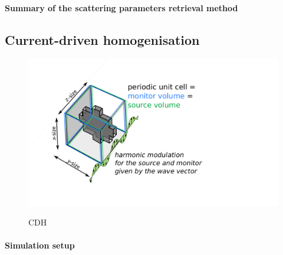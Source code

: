 
\paragraph{Summary of the scattering parameters retrieval method} %



\subsection{Current-driven homogenisation} %
\begin{figure}[ht] \centering \caption{CDH } \includegraphics[width=12cm]{img/cdh_geometry.pdf}  \label{fg_fdtd_cdh} \end{figure} %

\paragraph{Simulation setup}
